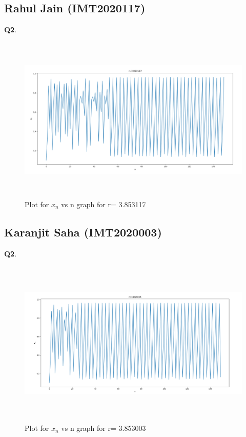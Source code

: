 \documentclass[11pt]{scrartcl} %
\begin{document}
\subsection{Rahul Jain (IMT2020117)}
\textbf{Q2}.
\begin{figure}[h] %
	\centering
	\includegraphics[width=12cm, height=8cm]{Rahul_singer.png} %
	\caption {Plot for $x_n$ vs n graph for r= 3.853117}
\end{figure}
\subsection{Karanjit Saha (IMT2020003)}
\textbf{Q2}.
\begin{figure}[h] %
	\centering
	\includegraphics[width=12cm, height=8cm]{Karanjit.png} %
	\caption {Plot for $x_n$ vs n graph for r= 3.853003}
\end{figure}
\newpage
\end{document}
